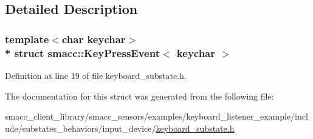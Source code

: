 \subsection{Detailed Description}
\subsubsection*{template$<$char keychar$>$\\*
struct smacc\+::\+Key\+Press\+Event$<$ keychar $>$}



Definition at line 19 of file keyboard\+\_\+substate.\+h.



The documentation for this struct was generated from the following file\+:\begin{DoxyCompactItemize}
\item 
smacc\+\_\+client\+\_\+library/smacc\+\_\+sensors/examples/keyboard\+\_\+listener\+\_\+example/include/substates\+\_\+behaviors/input\+\_\+device/\hyperlink{keyboard__substate_8h}{keyboard\+\_\+substate.\+h}\end{DoxyCompactItemize}
